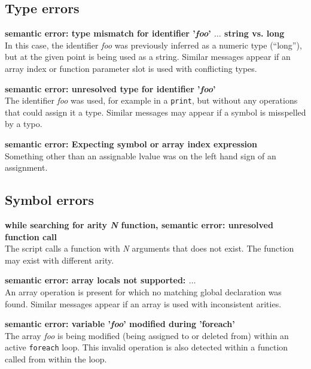 \documentclass{article}
\begin{document}
\subsection{Type errors}

\begin{description}
\item{\bf semantic error: type mismatch for identifier '{\em foo}'
$\ldots$ string vs. long} \\ In this case, the identifier {\em foo}
was previously inferred as a numeric type (``long''), but at the given
point is being used as a string.  Similar messages appear if an array
index or function parameter slot is used with conflicting types.

\item{\bf semantic error: unresolved type for identifier '{\em foo}'}
\\ The identifier {\em foo} was used, for example in a \verb+print+,
but without any operations that could assign it a type.  Similar
messages may appear if a symbol is misspelled by a typo.

\item{\bf semantic error: Expecting symbol or array index expression}
\\ Something other than an assignable lvalue was on the left hand sign
of an assignment.
\end{description}

\subsection{Symbol errors}

\begin{description}
\item{\bf while searching for arity {\em N} function, semantic error:
unresolved function call} \\ The script calls a function with {\em N}
arguments that does not exist.  The function may exist with different
arity.

\item{\bf semantic error: array locals not supported: $\ldots$} \\ An
array operation is present for which no matching global declaration
was found.  Similar messages appear if an array is used with
inconsistent arities.

\item{\bf semantic error: variable '{\em foo}' modified during 'foreach'} \\
The array {\em foo} is being modified (being assigned to or deleted from)
within an active \verb+foreach+ loop.  This invalid operation is also
detected within a function called from within the loop. 
\end{description}
\end{document}
